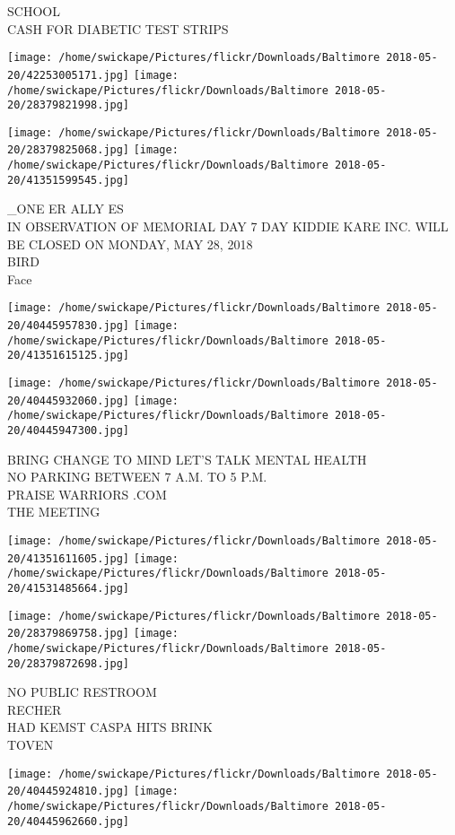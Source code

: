 \documentclass[10pt,letterpaper]{article}
\begin{document}
SCHOOL\\
CASH FOR DIABETIC TEST STRIPS
\pagebreak

\texttt{[image: /home/swickape/Pictures/flickr/Downloads/Baltimore 2018-05-20/42253005171.jpg]}
\texttt{[image: /home/swickape/Pictures/flickr/Downloads/Baltimore 2018-05-20/28379821998.jpg]}

\texttt{[image: /home/swickape/Pictures/flickr/Downloads/Baltimore 2018-05-20/28379825068.jpg]}
\texttt{[image: /home/swickape/Pictures/flickr/Downloads/Baltimore 2018-05-20/41351599545.jpg]}

\_ONE ER ALLY ES\\
IN OBSERVATION OF MEMORIAL DAY 7 DAY KIDDIE KARE INC. WILL BE CLOSED ON MONDAY, MAY 28, 2018\\
BIRD\\
Face
\pagebreak

\texttt{[image: /home/swickape/Pictures/flickr/Downloads/Baltimore 2018-05-20/40445957830.jpg]}
\texttt{[image: /home/swickape/Pictures/flickr/Downloads/Baltimore 2018-05-20/41351615125.jpg]}

\texttt{[image: /home/swickape/Pictures/flickr/Downloads/Baltimore 2018-05-20/40445932060.jpg]}
\texttt{[image: /home/swickape/Pictures/flickr/Downloads/Baltimore 2018-05-20/40445947300.jpg]}

BRING CHANGE TO MIND LET'S TALK MENTAL HEALTH\\
NO PARKING BETWEEN 7 A.M. TO 5 P.M.\\
PRAISE WARRIORS .COM\\
THE MEETING
\pagebreak

\texttt{[image: /home/swickape/Pictures/flickr/Downloads/Baltimore 2018-05-20/41351611605.jpg]}
\texttt{[image: /home/swickape/Pictures/flickr/Downloads/Baltimore 2018-05-20/41531485664.jpg]}

\texttt{[image: /home/swickape/Pictures/flickr/Downloads/Baltimore 2018-05-20/28379869758.jpg]}
\texttt{[image: /home/swickape/Pictures/flickr/Downloads/Baltimore 2018-05-20/28379872698.jpg]}

NO PUBLIC RESTROOM\\
RECHER\\
HAD KEMST CASPA HITS BRINK\\
TOVEN
\pagebreak

\texttt{[image: /home/swickape/Pictures/flickr/Downloads/Baltimore 2018-05-20/40445924810.jpg]}
\texttt{[image: /home/swickape/Pictures/flickr/Downloads/Baltimore 2018-05-20/40445962660.jpg]}
\end{document}
